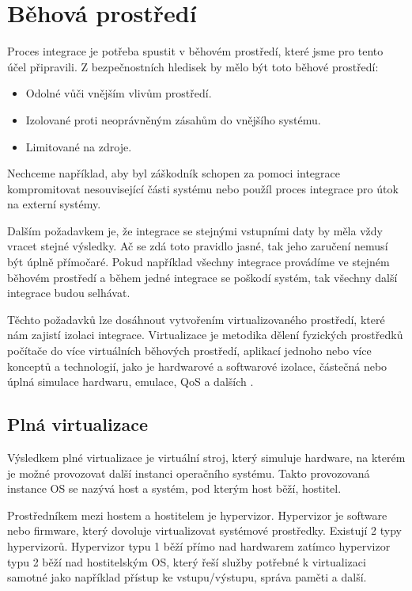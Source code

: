 \section{Běhová prostředí}

Proces integrace je potřeba spustit v běhovém prostředí, které jsme pro tento účel připravili.
Z bezpečnostních hledisek by mělo být toto běhové prostředí:

\begin{itemize}
	\item Odolné vůči vnějším vlivům prostředí.
	\item Izolované proti neoprávněným zásahům do vnějšího systému.
	\item Limitované na zdroje.
\end{itemize}

Nechceme například, aby byl záškodník schopen za pomoci integrace kompromitovat nesouvisející části systému nebo použíl proces integrace pro útok na externí systémy.

Dalším požadavkem je, že integrace se stejnými vstupními daty by měla vždy vracet stejné výsledky.
Ač se zdá toto pravidlo jasné, tak jeho zaručení nemusí být úplně přímočaré.
Pokud například všechny integrace provádíme ve stejném běhovém prostředí a během jedné integrace se poškodí systém, tak všechny další integrace budou selhávat.

Těchto požadavků lze dosáhnout vytvořením virtualizovaného prostředí, které nám zajistí izolaci integrace.
Virtualizace je metodika dělení fyzických prostředků počítače do více virtuálních běhových prostředí, aplikací jednoho nebo více konceptů a technologií, jako je hardwarové a softwarové izolace, částečná nebo úplná simulace hardwaru, emulace, QoS a dalších \cite{virt_intro}.

\subsection{Plná virtualizace}

Výsledkem plné virtualizace je virtuální stroj, který simuluje hardware, na kterém je možné provozovat další instanci operačního systému.
Takto provozovaná instance OS se nazývá host a systém, pod kterým host běží, hostitel.

Prostředníkem mezi hostem a hostitelem je hypervizor.
Hypervizor je software nebo firmware, který dovoluje virtualizovat systémové prostředky.
Existují 2 typy hypervizorů.
Hypervizor typu 1 běží přímo nad hardwarem zatímco hypervizor typu 2 běží nad hostitelským OS, který řeší služby potřebné k virtualizaci samotné jako například přístup ke vstupu/výstupu, správa paměti a další.
\cite{hypervisor_def}

